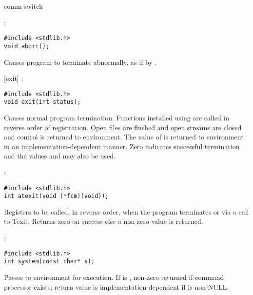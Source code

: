 \begin{Ventry2}{comm-switch  }
\item[abort]
\label{item:abort}
:
\begin{production}
\begin{verbatim}
#include <stdlib.h>
void abort();
\end{verbatim}
\end{production}

     Causes program to terminate abnormally, as if by .

[exit]
\label{item:exitC}
:
\begin{production}
\begin{verbatim}
#include <stdlib.h>
void exit(int status);
\end{verbatim}
\end{production}

     Causes normal program termination. Functions installed using
      are called in reverse order of registration. Open
     files are flushed and open streams are closed and control is
     returned to environment. The value of  is returned to
     environment in an implementation-dependent manner. Zero indicates
     successful termination and the values  and
      may also be used.

\item[atexit]
\label{item:atexit}
:
\begin{production}
\begin{verbatim}
#include <stdlib.h>
int atexit(void (*fcm)(void));
\end{verbatim}
\end{production}

     Registers  to be called, in reverse order, when the
	program terminates or via a call to T{exit}.  Returns zero on
	success else a non-zero value is returned.


\item[system]
\label{item:system}
:
\begin{production}
\begin{verbatim}
#include <stdlib.h>
int system(const char* s);
\end{verbatim}
\end{production}

     Passes  to environment for execution. If  is ,
     non-zero returned if command processor exists; return value is
     implementation-dependent if  is non-NULL.


\end{Ventry2}

